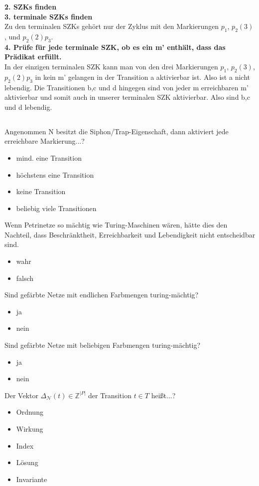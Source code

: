 \documentclass[a4paper,12pt]{scrartcl}
\begin{document}
\textbf{2. SZKs finden}\\
\textbf{3. terminale SZKs finden}\\
Zu den terminalen SZKs gehört nur der Zyklus mit den Markierungen $p_1$, $p_2 (3)$, und $p_2 (2)p_3$.\\
\textbf{4. Prüfe für jede terminale SZK, ob es ein m' enthält, dass das Prädikat erfüllt.} \\
In der einzigen terminalen SZK kann man von den drei Markierungen $p_1$, $p_2 (3)$,$p_2 (2)p_3$ in kein m' gelangen in der Transition a aktivierbar ist. Also ist a nicht lebendig. Die Transitionen b,c und d hingegen sind von jeder m erreichbaren m' aktivierbar und somit auch in unserer terminalen SZK aktivierbar. Also sind b,c und d lebendig.
\subsection{}
\subsection{}
Angenommen N besitzt die Siphon/Trap-Eigenschaft, dann aktiviert jede erreichbare Markierung...?
\begin{itemize}
\item{mind. eine Transition}
\item{höchstens eine Transition}
\item{keine Transition}
\item{beliebig viele Transitionen}
\end{itemize}
Wenn Petrinetze so mächtig wie Turing-Maschinen wären, hätte dies den Nachteil, dass Beschränktheit, Erreichbarkeit und Lebendigkeit nicht entscheidbar sind.
\begin{itemize}
\item{wahr}
\item{falsch}
\end{itemize}
Sind gefärbte Netze mit endlichen Farbmengen turing-mächtig?
\begin{itemize}
\item{ja}
\item{nein}
\end{itemize}
Sind gefärbte Netze mit beliebigen Farbmengen turing-mächtig?
\begin{itemize}
\item{ja}
\item{nein}
\end{itemize}
Der Vektor $\Delta_{\mathcal{N}}(t)\in \mathds{Z}^{|P|}$ der Transition $t\in T$ heißt...?
\begin{itemize}
\item{Ordnung}
\item{Wirkung}
\item{Index}
\item{Lösung}
\item{Invariante}
\end{itemize}
\end{document}
